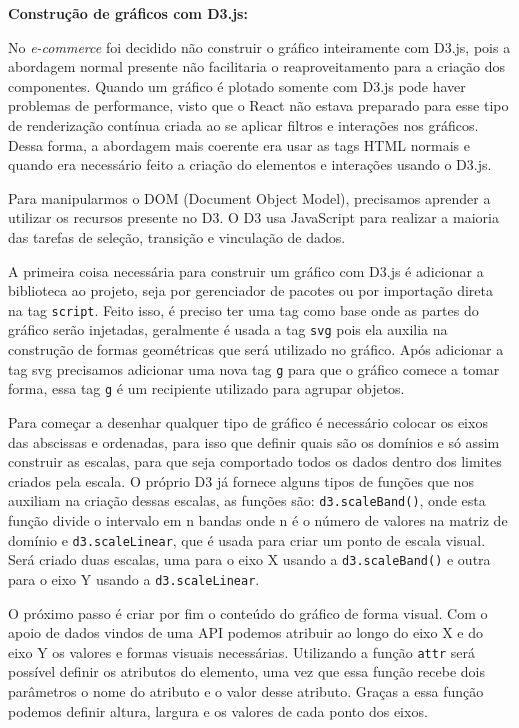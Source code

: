 {\textbf{Construção de gráficos com D3.js:}

No \textit{e-commerce} foi decidido não construir o gráfico inteiramente com D3.js, pois a abordagem normal presente não facilitaria o reaproveitamento para a criação dos componentes. Quando um gráfico é plotado somente com D3.js pode haver problemas de performance, visto que o React não estava preparado para esse tipo de renderização contínua criada ao se aplicar filtros e interações nos gráficos. Dessa forma, a abordagem mais coerente era usar as tags HTML normais e quando era necessário feito a criação do elementos e interações usando o D3.js.

Para manipularmos o DOM (Document Object Model), precisamos aprender a utilizar os recursos presente no D3. O D3 usa JavaScript para realizar a maioria das tarefas de seleção, transição e vinculação de dados.

A primeira coisa necessária para construir um gráfico com D3.js é adicionar a biblioteca ao projeto, seja por gerenciador de pacotes ou por importação direta na tag \lstinline{script}. Feito isso, é preciso ter uma tag como base onde as partes do gráfico serão injetadas, geralmente é usada a tag \lstinline{svg} pois ela auxilia na construção de formas geométricas que será utilizado no gráfico. Após adicionar a tag svg precisamos adicionar uma nova tag \lstinline{g} para que o gráfico comece a tomar forma, essa tag \lstinline{g} é um recipiente utilizado para agrupar objetos.

Para começar a desenhar qualquer tipo de gráfico é necessário colocar os eixos das abscissas e ordenadas, para isso que definir quais são os domínios e só assim construir as escalas, para que seja comportado todos os dados dentro dos limites criados pela escala. O próprio D3 já fornece alguns tipos de funções que nos auxiliam na criação dessas escalas, as funções são: \lstinline{d3.scaleBand()}, onde esta função divide o intervalo em n bandas onde n é o número de valores na matriz de domínio e \lstinline{d3.scaleLinear}, que é usada para criar um ponto de escala visual. Será criado duas escalas, uma para o eixo X usando a \lstinline{d3.scaleBand()} e outra para o eixo Y usando a \lstinline{d3.scaleLinear}.

O próximo passo é criar por fim o conteúdo do gráfico de forma visual. Com o apoio de dados vindos de uma API podemos atribuir ao longo do eixo X e do eixo Y os valores e formas visuais necessárias. Utilizando a função \lstinline{attr} será possível definir os atributos do elemento, uma vez que essa função recebe dois parâmetros o nome do atributo e o valor desse atributo. Graças a essa função podemos definir altura, largura e os valores de cada ponto dos eixos.

}
